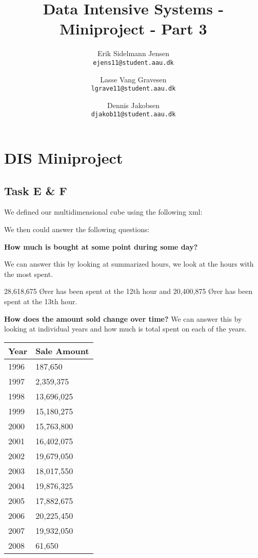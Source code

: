 

\author{
  Erik Sidelmann Jensen\\
  \texttt{ejens11@student.aau.dk}
  \and
  Lasse Vang Gravesen\\
  \texttt{lgrave11@student.aau.dk}
  \and
  Dennis Jakobsen\\
  \texttt{djakob11@student.aau.dk}  
}

\title{Data Intensive Systems - Miniproject - Part 3}
\date{}


	\clearpage\maketitle
	\thispagestyle{empty}
	
	\chapter{DIS Miniproject}
	\section{Task E \& F}
	We defined our multidimensional cube using the following xml:
	
	
	We then could answer the following questions:
	
	\textbf{How much is bought at some point during some day?}
	
	We can answer this by looking at summarized hours, we look at the hours with the most spent.
	
	28,618,675 Ører has been spent at the 12th hour and 20,400,875 Ører has been spent at the 13th hour.
	
	\textbf{How does the amount sold change over time?}
	We can answer this by looking at individual years and how much is total spent on each of the years.
	\begin{table}[H]
	    \begin{tabular}{l|l}
	    Year & Sale Amount \\ \hline
	    1996 & 187,650     \\
	    1997 & 2,359,375   \\
	    1998 & 13,696,025  \\
	    1999 & 15,180,275  \\
	    2000 & 15,763,800  \\
	    2001 & 16,402,075  \\
	    2002 & 19,679,050  \\
	    2003 & 18,017,550  \\
	    2004 & 19,876,325  \\
	    2005 & 17,882,675  \\
	    2006 & 20,225,450  \\
	    2007 & 19,932,050  \\
	    2008 & 61,650      \\
	    \end{tabular}
	\end{table}
	
